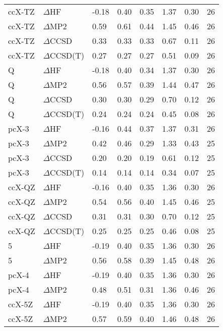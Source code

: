 \begin{table}
\begin{tabular}{l l l l l l l l }
    ccX-TZ & $\Delta$HF & -0.18 & 0.40 & 0.35 & 1.37 & 0.30 & 26 \\ 
    ccX-TZ & $\Delta$MP2 & 0.59 & 0.61 & 0.44 & 1.45 & 0.46 & 26 \\ 
    ccX-TZ & $\Delta$CCSD & 0.33 & 0.33 & 0.33 & 0.67 & 0.11 & 26 \\ 
    ccX-TZ & $\Delta$CCSD(T) & 0.27 & 0.27 & 0.27 & 0.51 & 0.09 & 26 \\ 
    Q & $\Delta$HF & -0.18 & 0.40 & 0.34 & 1.37 & 0.30 & 26 \\ 
    Q & $\Delta$MP2 & 0.56 & 0.57 & 0.39 & 1.44 & 0.47 & 26 \\ 
    Q & $\Delta$CCSD & 0.30 & 0.30 & 0.29 & 0.70 & 0.12 & 26 \\ 
    Q & $\Delta$CCSD(T) & 0.24 & 0.24 & 0.24 & 0.45 & 0.08 & 26 \\ 
    pcX-3 & $\Delta$HF & -0.16 & 0.44 & 0.37 & 1.37 & 0.31 & 26 \\ 
    pcX-3 & $\Delta$MP2 & 0.42 & 0.46 & 0.29 & 1.33 & 0.43 & 25 \\ 
    pcX-3 & $\Delta$CCSD & 0.20 & 0.20 & 0.19 & 0.61 & 0.12 & 25 \\ 
    pcX-3 & $\Delta$CCSD(T) & 0.14 & 0.14 & 0.14 & 0.34 & 0.07 & 25 \\ 
    ccX-QZ & $\Delta$HF & -0.16 & 0.40 & 0.35 & 1.36 & 0.30 & 26 \\ 
    ccX-QZ & $\Delta$MP2 & 0.54 & 0.56 & 0.40 & 1.45 & 0.46 & 25 \\ 
    ccX-QZ & $\Delta$CCSD & 0.31 & 0.31 & 0.30 & 0.70 & 0.12 & 25 \\ 
    ccX-QZ & $\Delta$CCSD(T) & 0.25 & 0.25 & 0.25 & 0.46 & 0.08 & 25 \\ 
    5 & $\Delta$HF & -0.19 & 0.40 & 0.35 & 1.36 & 0.30 & 26 \\ 
    5 & $\Delta$MP2 & 0.56 & 0.58 & 0.39 & 1.45 & 0.48 & 26 \\ 
    pcX-4 & $\Delta$HF & -0.19 & 0.40 & 0.35 & 1.36 & 0.30 & 26 \\ 
    pcX-4 & $\Delta$MP2 & 0.48 & 0.51 & 0.31 & 1.36 & 0.46 & 26 \\ 
    ccX-5Z & $\Delta$HF & -0.19 & 0.40 & 0.35 & 1.36 & 0.30 & 26 \\ 
    ccX-5Z & $\Delta$MP2 & 0.57 & 0.59 & 0.40 & 1.46 & 0.48 & 26 \\ 
    \bottomrule
  \end{tabular}
\end{table}
